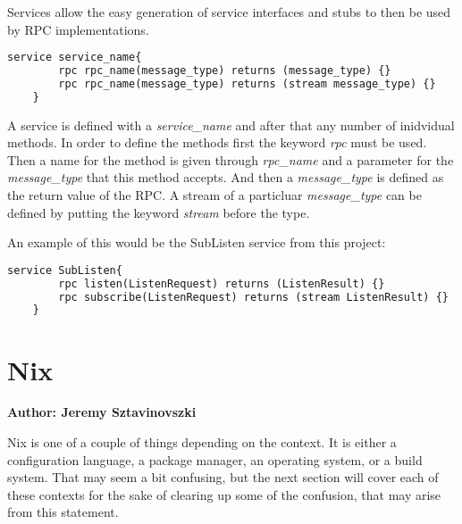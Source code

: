 Services allow the easy generation of service interfaces and stubs to then be used by RPC implementations.

\begin{minipage}{\textwidth}
\begin{lstlisting}[language=ProtoBuf, caption=Example of service definition in Protofiles]
    service service_name{
        rpc rpc_name(message_type) returns (message_type) {}
        rpc rpc_name(message_type) returns (stream message_type) {}
    }
\end{lstlisting}
\end{minipage}

A service is defined with a \textit{service\_name} and after that any number of inidvidual methods. In order to define the methods first the keyword \textit{rpc} must be used.
Then a name for the method is given through \textit{rpc\_name} and a parameter for the \textit{message\_type} that this method accepts. And then a \textit{message\_type}
is defined as the return value of the RPC. A stream of a particluar \textit{message\_type} can be defined by putting the keyword \textit{stream} before the type.

An example of this would be the SubListen service from this project:

\begin{minipage}{\textwidth}
\begin{lstlisting}[language=ProtoBuf, caption=Example of service definition in Protofiles]
    service SubListen{
        rpc listen(ListenRequest) returns (ListenResult) {}
        rpc subscribe(ListenRequest) returns (stream ListenResult) {}
    }
\end{lstlisting}
\end{minipage}

\section{Nix}
\textbf{Author: Jeremy Sztavinovszki}

Nix is one of a couple of things depending on the context. It is either a configuration language, a package manager, an operating system, or a build system.
That may seem a bit confusing, but the next section will cover each of these contexts for the sake of clearing up some of the confusion, that may arise from this statement.


